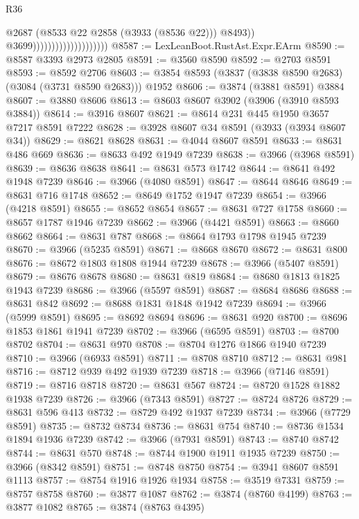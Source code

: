 \begin{lexlean}{R36}
\begin{coremodule}
                                                @2687
                                                (@8533 @22 @2858 (@3933 (@8536 @22)))
                                                @8493))
                                            @3699))))))))))))))))))))
@8587 := LexLeanBoot.RustAst.Expr.EArm
@8590 := @8587 @3393 @2973 @2805
@8591 := @3560 @8590
@8592 := @2703 @8591
@8593 := @8592 @2706
@8603 := @3854 @8593 (@3837 (@3838 @8590 @2683) (@3084 (@3731 @8590 @2683))) @1952
@8606 := @3874 (@3881 @8591) @3884
@8607 := @3880 @8606
@8613 := @8603 @8607 @3902 (@3906 (@3910 @8593 @3884))
@8614 := @3916 @8607
@8621 := @8614 @231 @445 @1950 @3657 @7217 @8591 @7222
@8628 := @3928 @8607 @34 @8591 (@3933 (@3934 @8607 @34))
@8629 := @8621 @8628
@8631 := @4044 @8607 @8591
@8633 := @8631 @486 @669
@8636 := @8633 @492 @1949 @7239
@8638 := @3966 (@3968 @8591)
@8639 := @8636 @8638
@8641 := @8631 @573 @1742
@8644 := @8641 @492 @1948 @7239
@8646 := @3966 (@4080 @8591)
@8647 := @8644 @8646
@8649 := @8631 @716 @1748
@8652 := @8649 @1752 @1947 @7239
@8654 := @3966 (@4218 @8591)
@8655 := @8652 @8654
@8657 := @8631 @727 @1758
@8660 := @8657 @1787 @1946 @7239
@8662 := @3966 (@4421 @8591)
@8663 := @8660 @8662
@8664 := @8631 @787
@8668 := @8664 @1793 @1798 @1945 @7239
@8670 := @3966 (@5235 @8591)
@8671 := @8668 @8670
@8672 := @8631 @800
@8676 := @8672 @1803 @1808 @1944 @7239
@8678 := @3966 (@5407 @8591)
@8679 := @8676 @8678
@8680 := @8631 @819
@8684 := @8680 @1813 @1825 @1943 @7239
@8686 := @3966 (@5597 @8591)
@8687 := @8684 @8686
@8688 := @8631 @842
@8692 := @8688 @1831 @1848 @1942 @7239
@8694 := @3966 (@5999 @8591)
@8695 := @8692 @8694
@8696 := @8631 @920
@8700 := @8696 @1853 @1861 @1941 @7239
@8702 := @3966 (@6595 @8591)
@8703 := @8700 @8702
@8704 := @8631 @970
@8708 := @8704 @1276 @1866 @1940 @7239
@8710 := @3966 (@6933 @8591)
@8711 := @8708 @8710
@8712 := @8631 @981
@8716 := @8712 @939 @492 @1939 @7239
@8718 := @3966 (@7146 @8591)
@8719 := @8716 @8718
@8720 := @8631 @567
@8724 := @8720 @1528 @1882 @1938 @7239
@8726 := @3966 (@7343 @8591)
@8727 := @8724 @8726
@8729 := @8631 @596 @413
@8732 := @8729 @492 @1937 @7239
@8734 := @3966 (@7729 @8591)
@8735 := @8732 @8734
@8736 := @8631 @754
@8740 := @8736 @1534 @1894 @1936 @7239
@8742 := @3966 (@7931 @8591)
@8743 := @8740 @8742
@8744 := @8631 @570
@8748 := @8744 @1900 @1911 @1935 @7239
@8750 := @3966 (@8342 @8591)
@8751 := @8748 @8750
@8754 := @3941 @8607 @8591 @1113
@8757 := @8754 @1916 @1926 @1934
@8758 := @3519 @7331
@8759 := @8757 @8758
@8760 := @3877 @1087
@8762 := @3874 (@8760 @4199)
@8763 := @3877 @1082
@8765 := @3874 (@8763 @4395)

\end{coremodule}
\end{lexlean}
